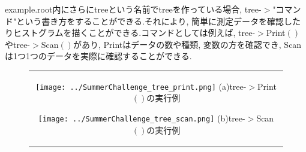 example.root内にさらにtreeという名前でtreeを作っている場合, tree-$>$"コマンド"という書き方をすることができる.それにより, 簡単に測定データを確認したりヒストグラムを描くことができる.コマンドとしては例えば, tree-$>$Print$\left(\right)$やtree-$>$Scan$\left(\right)$があり, Printはデータの数や種類, 変数の方を確認でき, Scanは1つ1つのデータを実際に確認することができる.
\begin{figure}[htbp]
  \begin{center}
    \begin{tabular}{c}

      \begin{minipage}{0.5\hsize}
        \begin{center}
          \texttt{[image: ../SummerChallenge\_tree\_print.png]}
          \hspace{1.6cm} (a)tree-$>$Print$\left(\right)$の実行例
        \end{center}
      \end{minipage}

      \begin{minipage}{0.5\hsize}
        \begin{center}
          \texttt{[image: ../SummerChallenge\_tree\_scan.png]}
          \hspace{1.6cm} (b)tree-$>$Scan$\left(\right)$の実行例
        \end{center}
      \end{minipage}
    \end{tabular}
  \end{center}
\end{figure}


